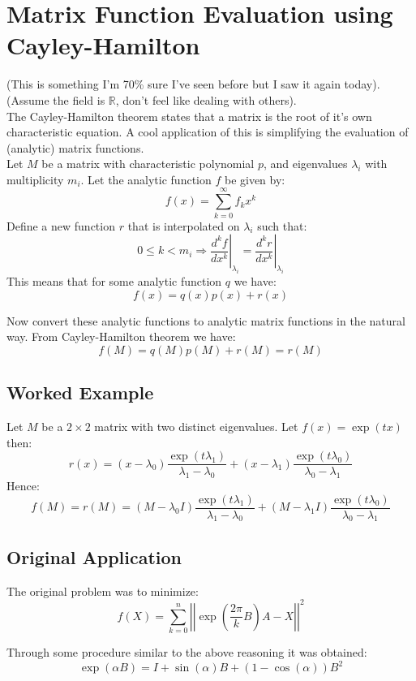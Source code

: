 
\section{Matrix Function Evaluation using Cayley-Hamilton}
(This is something I'm 70\% sure I've seen before but I saw it again today).
(Assume the field is $\mathbb{R}$, don't feel like dealing with others).
\\

The Cayley-Hamilton theorem states that a matrix is the root of it's own characteristic equation.
A cool application of this is simplifying the evaluation of (analytic) matrix functions.
\\

Let $M$ be a matrix with characteristic polynomial $p$,
and eigenvalues $\lambda_i$ with multiplicity $m_i$.
Let the analytic function $f$ be given by:
\[f(x) = \sum_{k=0}^\infty f_kx^k\]
Define a new function $r$ that is interpolated on $\lambda_i$ such that:
\[0\leq k< m_i \Rightarrow\left.\frac{d^k f}{d x^k}\right|_{\lambda_i} =\left.\frac{d^k r}{d x^k}\right|_{\lambda_i}\]
This means that for some analytic function $q$ we have:
\[f(x) = q(x)p(x)+r(x)\]

Now convert these analytic functions to analytic matrix functions in the natural way.
From Cayley-Hamilton theorem we have:
\[f(M) = q(M)p(M)+r(M) = r(M)\]

\subsection{Worked Example}
Let $M$ be a $2\times 2$ matrix with two distinct eigenvalues.
Let $f(x) = \exp(tx)$ then:
\[r(x) = (x-\lambda_0)\frac{\exp(t\lambda_1)}{\lambda_1-\lambda_0}+(x-\lambda_1)\frac{\exp(t\lambda_0)}{\lambda_0-\lambda_1}\]
Hence:
\[f(M) = r(M) =(M-\lambda_0I)\frac{\exp(t\lambda_1)}{\lambda_1-\lambda_0}+(M-\lambda_1I)\frac{\exp(t\lambda_0)}{\lambda_0-\lambda_1} \]

\subsection{Original Application}
The original problem was to minimize:
\[f(X) = \sum_{k=0}^n\left|\left|\exp\left(\frac{2\pi}{k}B\right)A-X\right|\right|^2\]

Through some procedure similar to the above reasoning it was obtained:
\[\exp(\alpha B) = I+ \sin(\alpha)B+(1-\cos(\alpha))B^2\]

